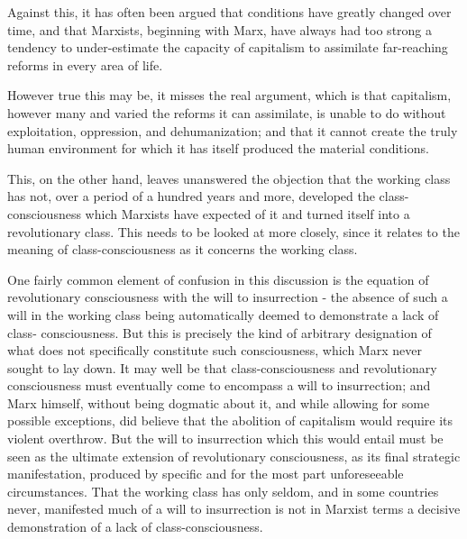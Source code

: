 Against this, it has often been argued that conditions have greatly changed over time, and that Marxists, beginning with Marx, have always had too strong a tendency to under\hyp{}estimate the capacity of capitalism to assimilate far\hyp{}reaching reforms in every area of life.

However true this may be, it misses the real argument, which is that capitalism, however many and varied the reforms it can assimilate, is unable to do without exploitation, oppression, and dehumanization; and that it cannot create the truly human environment for which it has itself produced the material conditions.

This, on the other hand, leaves unanswered the objection that the working class has not, over a period of a hundred years and more, developed the class-consciousness which Marxists have expected of it and turned itself into a revolutionary class. This needs to be looked at more closely, since it relates to the meaning of class-consciousness as it concerns the working class.

One fairly common element of confusion in this discussion is the equation of revolutionary consciousness with the will to insurrection - the absence of such a will in the working class being automatically deemed to demonstrate a lack of class- consciousness. But this is precisely the kind of arbitrary designation of what does not specifically constitute such consciousness, which Marx never sought to lay down. It may well be that class-consciousness and revolutionary consciousness must eventually come to encompass a will to insurrection; and Marx himself, without being dogmatic about it, and while allowing for some possible exceptions, did believe that the abolition of capitalism would require its violent overthrow. But the will to insurrection which this would entail must be seen as the ultimate extension of revolutionary consciousness, as its final strategic manifestation, produced by specific and for the most part unforeseeable circumstances. That the working class has only seldom, and in some countries never, manifested much of a will to insurrection is not in Marxist terms a decisive demonstration of a lack of class-consciousness.

